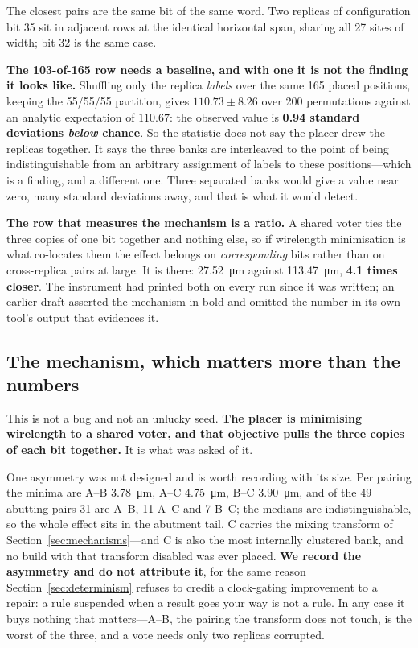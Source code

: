 \documentclass[11pt,a4paper]{article}
\begin{document}
The closest pairs are the same bit of the same word. Two replicas of
configuration bit 35 sit in adjacent rows at the identical horizontal
span, sharing all 27 sites of width; bit 32 is the same case.

\textbf{The 103-of-165 row needs a baseline, and with one it is not the
finding it looks like.} Shuffling only the replica \emph{labels} over the
same 165 placed positions, keeping the 55/55/55 partition, gives
$110.73 \pm 8.26$ over 200 permutations against an analytic expectation
of $110.67$: the observed value is \textbf{0.94 standard deviations
\emph{below} chance}. So the statistic does not say the placer drew the
replicas together. It says the three banks are interleaved to the point
of being indistinguishable from an arbitrary assignment of labels to
these positions---which is a finding, and a different one. Three
separated banks would give a value near zero, many standard deviations
away, and that is what it would detect.

\textbf{The row that measures the mechanism is a ratio.} A shared voter
ties the three copies of one bit together and nothing else, so if
wirelength minimisation is what co-locates them the effect belongs on
\emph{corresponding} bits rather than on cross-replica pairs at large.
It is there: \SI{27.52}{\micro\meter} against
\SI{113.47}{\micro\meter}, \textbf{4.1 times closer}. The instrument had
printed both on every run since it was written; an earlier draft
asserted the mechanism in bold and omitted the number in its own tool's
output that evidences it.

\subsection{The mechanism, which matters more than the numbers}

This is not a bug and not an unlucky seed. \textbf{The placer is
minimising wirelength to a shared voter, and that objective pulls the
three copies of each bit together.} It is what was asked of it.

One asymmetry was not designed and is worth recording with its size.
Per pairing the minima are A--B \SI{3.78}{\micro\meter}, A--C
\SI{4.75}{\micro\meter}, B--C \SI{3.90}{\micro\meter}, and of the 49
abutting pairs 31 are A--B, 11 A--C and 7 B--C; the medians are
indistinguishable, so the whole effect sits in the abutment tail. C
carries the mixing transform of Section~\ref{sec:mechanisms}---and C is
also the most internally clustered bank, and no build with that
transform disabled was ever placed. \textbf{We record the asymmetry and
do not attribute it}, for the same reason
Section~\ref{sec:determinism} refuses to credit a clock-gating
improvement to a repair: a rule suspended when a result goes your way is
not a rule. In any case it buys nothing that matters---A--B, the pairing
the transform does not touch, is the worst of the three, and a vote
needs only two replicas corrupted.
\end{document}
